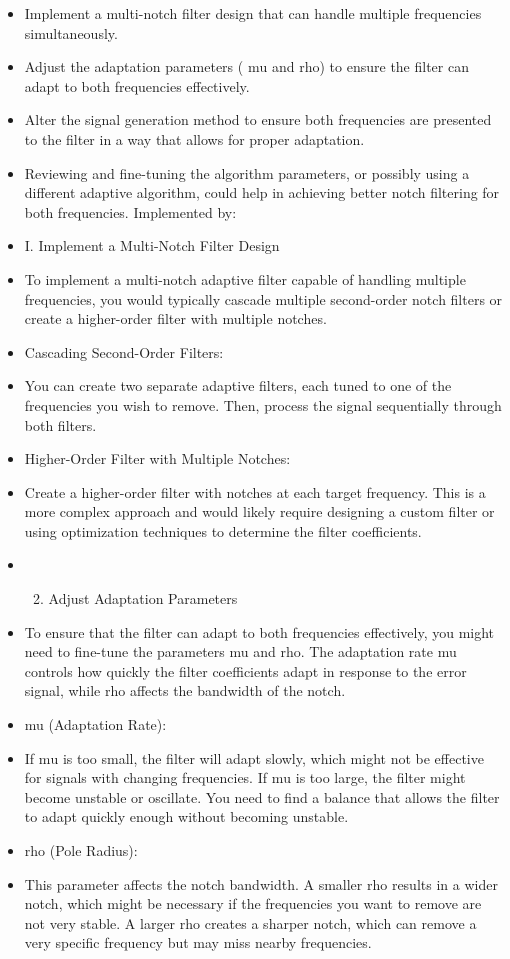 \begin{itemize}
  \item Implement a multi-notch filter design that can handle multiple frequencies simultaneously.
  \item Adjust the adaptation parameters ( $\mathrm{mu}$ and rho) to ensure the filter can adapt to both frequencies effectively.
  \item Alter the signal generation method to ensure both frequencies are presented to the filter in a way that allows for proper adaptation.
  \item Reviewing and fine-tuning the algorithm parameters, or possibly using a different adaptive algorithm, could help in achieving better notch filtering for both frequencies. Implemented by:
  \item I. Implement a Multi-Notch Filter Design
  \item To implement a multi-notch adaptive filter capable of handling multiple frequencies, you would typically cascade multiple second-order notch filters or create a higher-order filter with multiple notches.
  \item Cascading Second-Order Filters:
  \item You can create two separate adaptive filters, each tuned to one of the frequencies you wish to remove. Then, process the signal sequentially through both filters.
  \item Higher-Order Filter with Multiple Notches:
  \item Create a higher-order filter with notches at each target frequency. This is a more complex approach and would likely require designing a custom filter or using optimization techniques to determine the filter coefficients.
  \item 
  \begin{enumerate}
    \setcounter{enumii}{1}
    \item Adjust Adaptation Parameters
  \end{enumerate}
  \item To ensure that the filter can adapt to both frequencies effectively, you might need to fine-tune the parameters mu and rho. The adaptation rate mu controls how quickly the filter coefficients adapt in response to the error signal, while rho affects the bandwidth of the notch.
  \item mu (Adaptation Rate):
  \item If $\mathrm{mu}$ is too small, the filter will adapt slowly, which might not be effective for signals with changing frequencies. If $\mathrm{mu}$ is too large, the filter might become unstable or oscillate. You need to find a balance that allows the filter to adapt quickly enough without becoming unstable.
  \item rho (Pole Radius):
  \item This parameter affects the notch bandwidth. A smaller rho results in a wider notch, which might be necessary if the frequencies you want to remove are not very stable. A larger rho creates a sharper notch, which can remove a very specific frequency but may miss nearby frequencies.
\end{itemize}

